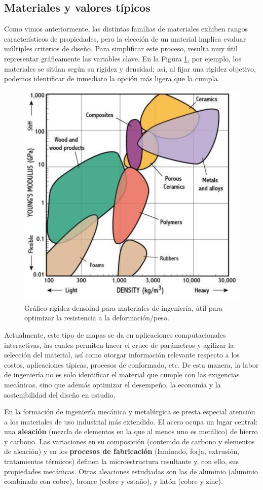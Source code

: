 \subsection{Materiales y valores típicos}

Como vimos anteriormente, las distintas familias de materiales exhiben rangos característicos de propiedades, pero la elección de un material implica evaluar múltiples criterios de diseño. Para simplificar este proceso, resulta muy útil representar gráficamente las variables clave. En la Figura \ref{props}, por ejemplo, los materiales se sitúan según su rigidez y densidad; así, al fijar una rigidez objetivo, podemos identificar de inmediato la opción más ligera que la cumpla.

\begin{figure}[h!]
    \centering
    \includegraphics[width=0.6\linewidth]{imgs/comp.png}
    \caption{Gráfico rigidez-densidad para materiales de ingeniería, útil para optimizar la resistencia a la deformación/peso.}
    \label{props}
\end{figure}

Actualmente, este tipo de mapas se da en aplicaciones computacionales interactivas, las cuales permiten hacer el cruce de parámetros y agilizar la selección del material, así como otorgar información relevante respecto a los costos, aplicaciones típicas, procesos de conformado, etc. De esta manera, la labor de ingeniería no es solo identificar el material que cumple con las exigencias mecánicas, sino que además optimizar el desempeño, la economía y la sostenibilidad del diseño en estudio.

En la formación de ingeniería mecánica y metalúrgica se presta especial atención a los materiales de uso industrial más extendido. El acero ocupa un lugar central: una \textbf{aleación} (mezcla de elementos en la que al menos uno es metálico) de hierro y carbono. Las variaciones en su composición (contenido de carbono y elementos de aleación) y en los \textbf{procesos de fabricación} (laminado, forja, extrusión, tratamientos térmicos) definen la microestructura resultante y, con ello, sus propiedades mecánicas. Otras aleaciones estudiadas son las de aluminio (aluminio combinado con cobre), bronce (cobre y estaño), y latón (cobre y zinc).

